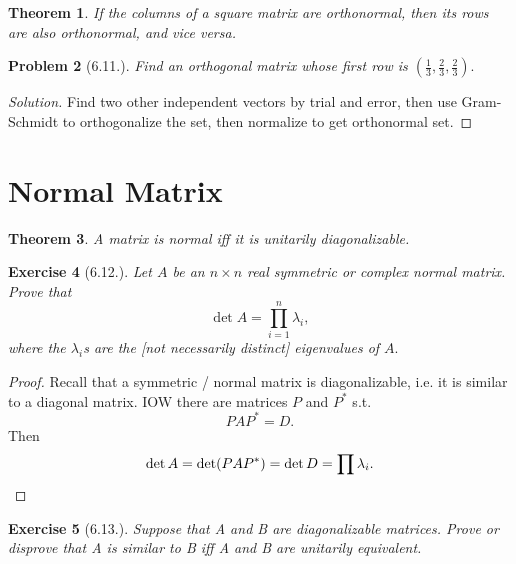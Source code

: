 \documentclass[20pt]{extarticle}
\theoremstyle{plain}
\newtheorem{theorem}{Theorem}
\newtheorem{problem}[theorem]{Problem}
\newtheorem{exercise}[theorem]{Exercise}
\theoremstyle{definition}
\theoremstyle{remark}
\newenvironment{solution}{\begin{proof}[Solution]}{\end{proof}}
\newcommand{\0}{\varnothing}
\newcommand{\<}{\langle}
\renewcommand{\>}{\rangle}
\begin{document}
\begin{theorem}
  If the columns of a square matrix are orthonormal, then its rows are also orthonormal, and vice versa.
\end{theorem}

\begin{problem}[6.11.]
  Find an orthogonal matrix whose first row is \( (\frac{1}{3}, \frac{2}{3}, \frac{2}{3}). \)
\end{problem}

\begin{solution}
  Find two other independent vectors by trial and error, then use Gram-Schmidt to orthogonalize the set, then normalize to get orthonormal set.
\end{solution}

\section{Normal Matrix}

\begin{theorem}
  A matrix is normal iff it is unitarily diagonalizable.
\end{theorem}

\begin{exercise}[6.12.]
  Let \( A \) be an \( n \times n \) real symmetric or complex normal matrix. Prove that
  \[
  \det A = \prod_{i=1}^n \lambda_i,
  \]
  where the \( \lambda_i \)s are the [not necessarily distinct] eigenvalues of \( A. \)
\end{exercise}

\begin{proof}
  Recall that a symmetric / normal matrix is diagonalizable, i.e. it is similar to a diagonal matrix. IOW there are matrices \( P \) and \( P^* \) s.t.
  \[
  P A P^* = D.
  \]
  Then
  \[
  \det A = \det (P A P^*) = \det D = \prod \lambda_i. \qedhere
  \]
\end{proof}

\begin{exercise}[6.13.]
  Suppose that A and B are diagonalizable matrices. Prove or disprove that A is similar to B iff A and B are unitarily equivalent.
\end{exercise}
\end{document}
